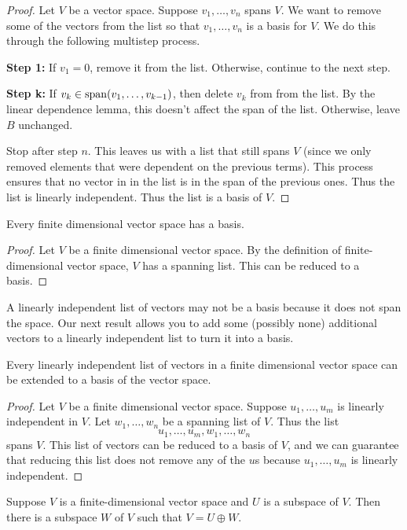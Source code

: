 \begin{proof}
    Let $V$ be a vector space. Suppose $v_1, \dots, v_n$ spans $V$. We want to remove some of the vectors from the list so that $v_1, \dots, v_n$ is a basis for $V$. We do this through the following multistep process.

    \textbf{Step 1:} If $v_1 = 0$, remove it from the list. Otherwise, continue to the next step.

    \textbf{Step k:} If $v_k\in\operatorname{span}(v_1, \dots, v_{k-1})$, then delete $v_k$ from from the list. By the linear dependence lemma, this doesn't affect the span of the list. Otherwise, leave $B$ unchanged.

    Stop after step $n$. This leaves us with a list that still spans $V$ (since we only removed elements that were dependent on the previous terms). This process ensures that no vector in in the list is in the span of the previous ones. Thus the list is linearly independent. Thus the list is a basis of $V$.
\end{proof}
\begin{theorem}
    Every finite dimensional vector space has a basis.
\end{theorem}
\begin{proof}
    Let $V$ be a finite dimensional vector space. By the definition of finite-dimensional vector space, $V$ has a spanning list. This can be reduced to a basis. 
\end{proof}
A linearly independent list of vectors may not be a basis because it does not span the space. Our next result allows you to add some (possibly none) additional vectors to a linearly independent list to turn it into a basis.
\begin{theorem}
    Every linearly independent list of vectors in a finite dimensional vector space can be extended to a basis of the vector space.
\end{theorem}
\begin{proof}
    Let $V$ be a finite dimensional vector space. Suppose $u_1, \dots, u_m$ is linearly independent in $V$. Let $w_1, \dots, w_n$ be a spanning list of $V$. Thus the list
    \[ u_1, \dots, u_m, w_1, \dots, w_n\]
    spans $V$. This list of vectors can be reduced to a basis of $V$, and we can guarantee that reducing this list does not remove any of the $u$s because $u_1, \dots, u_m$ is linearly independent.
\end{proof}
\begin{theorem}
    Suppose $V$ is a finite-dimensional vector space and $U$ is a subspace of $V$. Then there is a subspace $W$ of $V$ such that $V = U\oplus W$.
\end{theorem}
